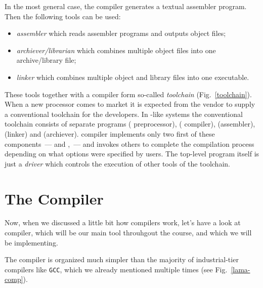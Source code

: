 In the most general case, the compiler generates a textual assembler program. Then the following tools can be used:

\FloatBarrier

\begin{itemize}
\item \emph{assembler} which reads assembler programs and outputs object files;
\item \emph{archiever/librarian} which combines multiple object files into one archive/library file;
\item \emph{linker} which combines multiple object and library files into one executable.
\end{itemize}

These tools together with a compiler form so-called \emph{toolchain} (Fig.~\ref{toolchain}). When a new processor comes to market it is expected from
the vendor to supply a conventional toolchain for the developers. In -like systems the conventional
toolchain consists of separate programs  ( preprocessor),  ( compiler),
 (assembler),  (linker) and  (archiever).  compiler implements only two first
of these components~---  and ,~--- and invokes others to complete the compilation process
depending on what options were specified by users. The top-level program  itself is just a \emph{driver}
which controls the execution of other tools of the toolchain. 

\section{The \lama Compiler}

Now, when we discussed a little bit how compilers work, let's have a look at \lama compiler, which will be our main
tool throuhgout the course, and which we will be implementing.

The \lama compiler is organized much simpler than the majority of industrial-tier compilers like \texttt{GCC}, which we already
mentioned multiple times (see Fig.~\ref{lama-comp}).

